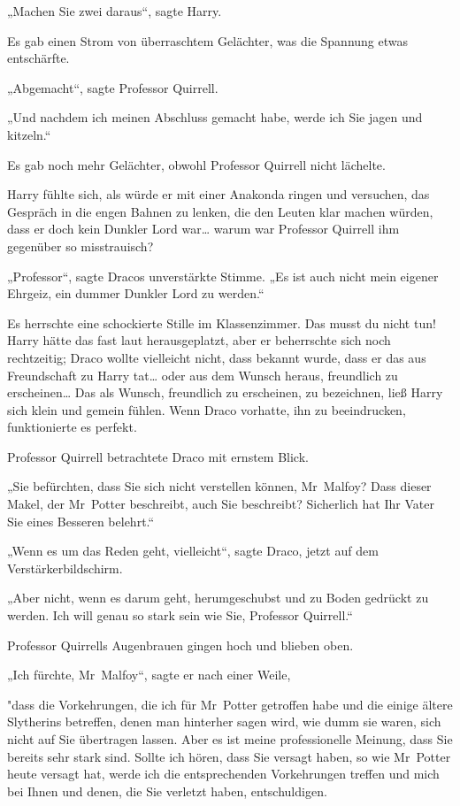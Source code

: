 {„Machen Sie zwei daraus“, sagte Harry.

Es gab einen Strom von überraschtem Gelächter, was die Spannung etwas entschärfte.

„Abgemacht“, sagte Professor Quirrell.

„Und nachdem ich meinen Abschluss gemacht habe, werde ich Sie jagen und kitzeln.“

Es gab noch mehr Gelächter, obwohl Professor Quirrell nicht lächelte.

Harry fühlte sich, als würde er mit einer Anakonda ringen und versuchen, das Gespräch in die engen Bahnen zu lenken, die den Leuten klar machen würden, dass er doch kein Dunkler Lord war… warum war Professor Quirrell ihm gegenüber so misstrauisch?

„Professor“, sagte Dracos unverstärkte Stimme. „Es ist auch nicht mein eigener Ehrgeiz, ein dummer Dunkler Lord zu werden.“

Es herrschte eine schockierte Stille im Klassenzimmer. Das musst du nicht tun! Harry hätte das fast laut herausgeplatzt, aber er beherrschte sich noch rechtzeitig; Draco wollte vielleicht nicht, dass bekannt wurde, dass er das aus Freundschaft zu Harry tat… oder aus dem Wunsch heraus, freundlich zu erscheinen… Das als Wunsch, freundlich zu erscheinen, zu bezeichnen, ließ Harry sich klein und gemein fühlen. Wenn Draco vorhatte, ihn zu beeindrucken, funktionierte es perfekt.

Professor Quirrell betrachtete Draco mit ernstem Blick.

„Sie befürchten, dass Sie sich nicht verstellen können, Mr~Malfoy? Dass dieser Makel, der Mr~Potter beschreibt, auch Sie beschreibt? Sicherlich hat Ihr Vater Sie eines Besseren belehrt.“

„Wenn es um das Reden geht, vielleicht“, sagte Draco, jetzt auf dem Verstärkerbildschirm.

„Aber nicht, wenn es darum geht, herumgeschubst und zu Boden gedrückt zu werden. Ich will genau so stark sein wie Sie, Professor Quirrell.“

Professor Quirrells Augenbrauen gingen hoch und blieben oben.

„Ich fürchte, Mr~Malfoy“, sagte er nach einer Weile,

"dass die Vorkehrungen, die ich für Mr~Potter getroffen habe und die einige ältere Slytherins betreffen, denen man hinterher sagen wird, wie dumm sie waren, sich nicht auf Sie übertragen lassen. Aber es ist meine professionelle Meinung, dass Sie bereits sehr stark sind. Sollte ich hören, dass Sie versagt haben, so wie Mr~Potter heute versagt hat, werde ich die entsprechenden Vorkehrungen treffen und mich bei Ihnen und denen, die Sie verletzt haben, entschuldigen.

}
